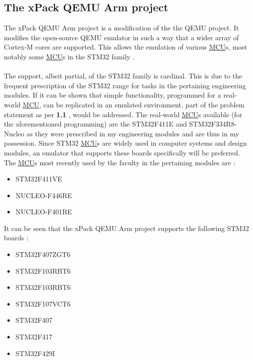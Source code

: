 \subsection{The xPack QEMU Arm project}
\label{xpack}
The xPack QEMU Arm project is a modification of the the QEMU project. It modifies the open-source QEMU emulator in such a way that a wider array of Cortex-M cores are supported. This allows the emulation of various \hyperref[listAbr]{MCU}s, most notably some \hyperref[listAbr]{MCU}s in the STM32 family \cite{xPack}.
\\\\
The support, albeit partial, of the STM32 family is cardinal. This is due to the frequent prescription of the STM32 range for tasks in the pertaining engineering modules. If it can be shown that simple functionality, programmed for a real-world \hyperref[listAbr]{MCU}, can be replicated in an emulated environment, part of the problem statement as per \textbf{1.1 }, would be addressed. The real-world \hyperref[listAbr]{MCU}s available (for the aforementioned programming) are the STM32F411E and STM32F334R8-Nucleo as they were prescribed in my engineering modules and are thus in my possession. Since STM32 \hyperref[listAbr]{MCU}s are widely used in computer systems and design modules, an emulator that supports these boards specifically will be preferred. The \hyperref[listAbr]{MCU}s most recently used by the faculty in the pertaining modules are \cite{emailVis}:

\begin{itemize}
\item STM32F411VE
\item  NUCLEO-F446RE
\item   NUCLEO-F401RE 
\end{itemize}



It can be seen that the xPack QEMU Arm project supports the following STM32 boards  \cite{xPack}:

\begin{itemize}
\item STM32F407ZGT6
\item STM32F103RBT6
\item STM32F103RBT6
\item STM32F107VCT6
\item STM32F407
\item STM32F417
\item STM32F429I
\end{itemize}

